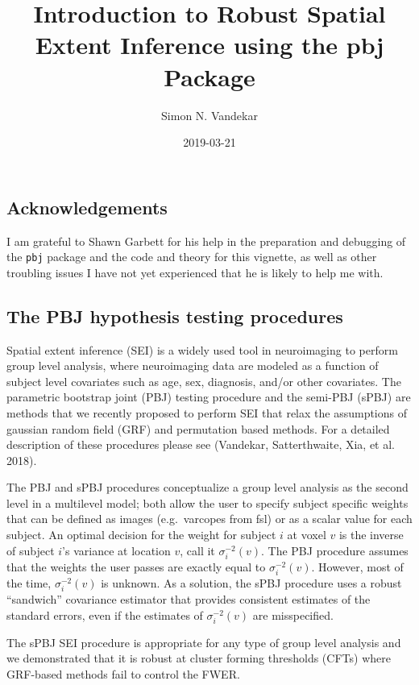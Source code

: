 \documentclass[]{article}
\title{Introduction to Robust Spatial Extent Inference using the pbj Package}
\author{Simon N. Vandekar}
\date{2019-03-21}
\begin{document}
\maketitle

\subsection{Acknowledgements}\label{acknowledgements}

I am grateful to Shawn Garbett for his help in the preparation and
debugging of the \texttt{pbj} package and the code and theory for this
vignette, as well as other troubling issues I have not yet experienced
that he is likely to help me with.

\subsection{The PBJ hypothesis testing
procedures}\label{the-pbj-hypothesis-testing-procedures}

Spatial extent inference (SEI) is a widely used tool in neuroimaging to
perform group level analysis, where neuroimaging data are modeled as a
function of subject level covariates such as age, sex, diagnosis, and/or
other covariates. The parametric bootstrap joint (PBJ) testing procedure
and the semi-PBJ (sPBJ) are methods that we recently proposed to perform
SEI that relax the assumptions of gaussian random field (GRF) and
permutation based methods. For a detailed description of these
procedures please see (Vandekar, Satterthwaite, Xia, et al. 2018).

The PBJ and sPBJ procedures conceptualize a group level analysis as the
second level in a multilevel model; both allow the user to specify
subject specific weights that can be defined as images (e.g.~varcopes
from fsl) or as a scalar value for each subject. An optimal decision for
the weight for subject \(i\) at voxel \(v\) is the inverse of subject
\(i\)'s variance at location \(v\), call it \(\sigma^{-2}_i(v)\). The
PBJ procedure assumes that the weights the user passes are exactly equal
to \(\sigma^{-2}_i(v)\). However, most of the time, \(\sigma^{-2}_i(v)\)
is unknown. As a solution, the sPBJ procedure uses a robust ``sandwich''
covariance estimator that provides consistent estimates of the standard
errors, even if the estimates of \(\sigma^{-2}_i(v)\) are misspecified.

The sPBJ SEI procedure is appropriate for any type of group level
analysis and we demonstrated that it is robust at cluster forming
thresholds (CFTs) where GRF-based methods fail to control the FWER.
\end{document}
